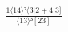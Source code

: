 \documentclass[varwidth, border=5pt]{standalone}
\begin{document}
\begin{my}
$\begin{gathered}
\scriptscriptstyle\frac{1⟨14⟩²⟨3|2+4|3]}{⟨13⟩³[23]}
\end{gathered}$
\end{my}
\end{document}
